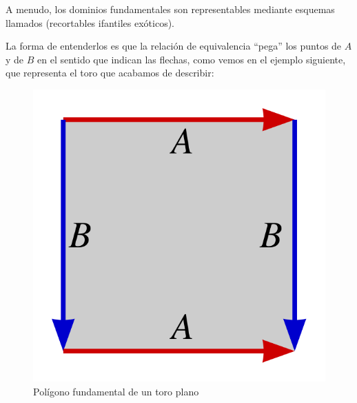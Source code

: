 	A menudo, los dominios fundamentales son representables mediante esquemas llamados  (recortables ifantiles exóticos).
	
	La forma de entenderlos es que la relación de equivalencia ``pega'' los puntos de $A$ y de $B$ en el sentido que indican las flechas, como vemos en el ejemplo siguiente, que representa el toro que acabamos de describir:
	
	\begin{figure}[h!]
		\centering
		\includegraphics[scale = 0.1]{img/pol_fund_toro}
		\caption{Polígono fundamental de un toro plano}
		\label{const_img_polfun_toro}
	\end{figure}

